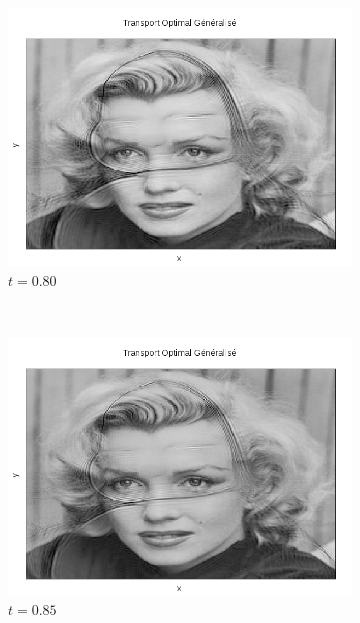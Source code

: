 \documentclass[a4paper,12pt]{article}
\begin{document}
\begin{figure}[!h]
\begin{subfigure}[b]{0.23\linewidth}
\includegraphics[width=\linewidth]{img/2DMorphing/T_00177.png}
\caption*{$t=0.80$}
\end{subfigure}
~
\begin{subfigure}[b]{0.23\linewidth}
\includegraphics[width=\linewidth]{img/2DMorphing/T_00188.png}
\caption*{$t=0.85$}
\end{subfigure}
~
\begin{subfigure}[b]{0.23\linewidth}

\end{subfigure}
\end{figure}
\end{document}

